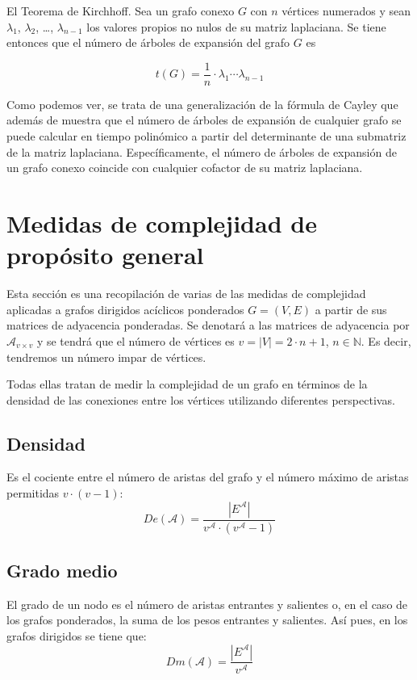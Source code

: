 \begin{theorem}
El Teorema de Kirchhoff. Sea un grafo conexo $G$ con $n$ vértices numerados y sean $\lambda_1$, $\lambda_2$, \dots, $\lambda_{n-1}$ los valores propios no nulos de su matriz laplaciana. Se tiene entonces que el número de árboles de expansión del grafo $G$ es

\begin{equation}
t(G) = \frac{1}{n} \cdot \lambda_1 \cdots \lambda_{n-1}
\end{equation}

Como podemos ver, se trata de una generalización de la fórmula de Cayley que además de muestra que el número de árboles de expansión de cualquier grafo se puede calcular en tiempo polinómico a partir del determinante de una submatriz de la matriz laplaciana. Específicamente, el número de árboles de expansión de un grafo conexo coincide con cualquier cofactor de su matriz laplaciana.
\end{theorem}

\section{Medidas de complejidad de propósito general}

Esta sección es una recopilación de varias de las medidas de complejidad \cite{cormen2022introduction} aplicadas a grafos dirigidos acíclicos ponderados $G = (V,E)$ a partir de sus matrices de adyacencia ponderadas. Se denotará a las matrices de adyacencia por $\mathcal{A}_{v\times v}$ y se tendrá que el número de vértices es $v = |V| = 2\cdot n + 1$, $n \in \mathbb{N}$. Es decir, tendremos un número impar de vértices.

Todas ellas tratan de medir la complejidad de un grafo en términos de la densidad de las conexiones entre los vértices utilizando diferentes perspectivas.

\subsection{Densidad}
Es el cociente entre el número de aristas del grafo y el número máximo de aristas permitidas $v \cdot (v-1)$:
\begin{equation}
De(\mathcal{A}) = \frac{|E^{\mathcal{A}}|}{v^{\mathcal{A}}\cdot (v^{\mathcal{A}}-1)}
\end{equation}
\subsection{Grado medio}
El grado de un nodo es el número de aristas entrantes y salientes o, en el caso de los grafos ponderados, la suma de los pesos entrantes y salientes. Así pues, en los grafos dirigidos se tiene que:
\begin{equation}
Dm(\mathcal{A}) = \frac{|E^{\mathcal{A}}|}{v^{\mathcal{A}}}
\end{equation}
